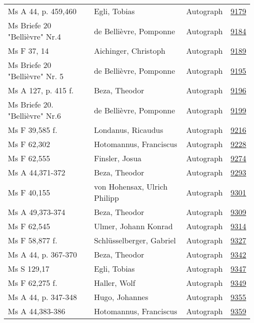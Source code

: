 \documentclass[10pt,a4paper,landscape]{report}
\begin{document}
\begin{longtable}{p{16cm}p{4cm}lr}
Ms A 44, p. 459,460	&	Egli, Tobias	&	Autograph	&	\href{http://130.60.24.72/assignment/9179}{9179}\\
Ms Briefe 20 "Bellièvre" Nr.4	&	de Bellièvre, Pomponne	&	Autograph	&	\href{http://130.60.24.72/assignment/9184}{9184}\\
Ms F 37, 14	&	Aichinger, Christoph	&	Autograph	&	\href{http://130.60.24.72/assignment/9189}{9189}\\
Ms Briefe 20 "Bellièvre" Nr. 5	&	de Bellièvre, Pomponne	&	Autograph	&	\href{http://130.60.24.72/assignment/9195}{9195}\\
Ms A 127, p. 415 f.	&	Beza, Theodor	&	Autograph	&	\href{http://130.60.24.72/assignment/9196}{9196}\\
Ms Briefe 20. "Bellièvre" Nr.6	&	de Bellièvre, Pomponne	&	Autograph	&	\href{http://130.60.24.72/assignment/9199}{9199}\\
Ms F 39,585 f.	&	Londanus, Ricaudus	&	Autograph	&	\href{http://130.60.24.72/assignment/9216}{9216}\\
Ms F 62,302	&	Hotomannus, Franciscus	&	Autograph	&	\href{http://130.60.24.72/assignment/9228}{9228}\\
Ms F 62,555	&	Finsler, Josua	&	Autograph	&	\href{http://130.60.24.72/assignment/9274}{9274}\\
Ms A 44,371-372	&	Beza, Theodor	&	Autograph	&	\href{http://130.60.24.72/assignment/9293}{9293}\\
Ms F 40,155	&	von Hohensax, Ulrich Philipp	&	Autograph	&	\href{http://130.60.24.72/assignment/9301}{9301}\\
Ms A 49,373-374	&	Beza, Theodor	&	Autograph	&	\href{http://130.60.24.72/assignment/9309}{9309}\\
Ms F 62,545	&	Ulmer, Johann Konrad	&	Autograph	&	\href{http://130.60.24.72/assignment/9314}{9314}\\
Ms F 58,877 f.	&	Schlüsselberger, Gabriel	&	Autograph	&	\href{http://130.60.24.72/assignment/9327}{9327}\\
Ms A 44, p. 367-370	&	Beza, Theodor	&	Autograph	&	\href{http://130.60.24.72/assignment/9342}{9342}\\
Ms S 129,17	&	Egli, Tobias	&	Autograph	&	\href{http://130.60.24.72/assignment/9347}{9347}\\
Ms F 62,275 f.	&	Haller, Wolf	&	Autograph	&	\href{http://130.60.24.72/assignment/9349}{9349}\\
Ms A 44, p. 347-348	&	Hugo, Johannes	&	Autograph	&	\href{http://130.60.24.72/assignment/9355}{9355}\\
Ms A 44,383-386	&	Hotomannus, Franciscus	&	Autograph	&	\href{http://130.60.24.72/assignment/9359}{9359}\\

\end{longtable}
\end{document}
